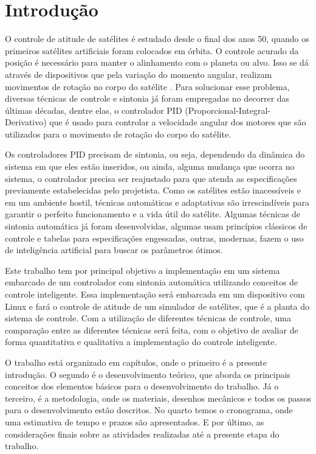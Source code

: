 \chapter[Introdução]{Introdução}

O controle de atitude de satélites é estudado desde o final dos anos 50, quando os primeiros satélites artificiais foram colocados em órbita. O controle acurado da posição é necessário para manter o alinhamento com o planeta ou alvo. Isso se dá através de dispositivos que pela variação do momento angular, realizam movimentos de rotação no corpo do satélite . Para solucionar esse problema, diversas técnicas de controle e sintonia já foram empregadas no decorrer das últimas décadas, dentre elas, o controlador PID (Proporcional-Integral-Derivativo) que é usado para controlar a velocidade angular dos motores que são utilizados para o movimento de rotação do corpo do satélite.

Os controladores PID precisam de sintonia, ou seja, dependendo da dinâmica do sistema em que eles estão inseridos, ou ainda, alguma mudança que ocorra no sistema, o controlador precisa ser reajustado para que atenda as especificações previamente estabelecidas pelo projetista. Como os satélites estão inacessíveis e em um ambiente hostil, técnicas automáticas e adaptativas são irrescindíveis para garantir o perfeito funcionamento e a vida útil do satélite. Algumas técnicas de sintonia automática já foram desenvolvidas, algumas usam princípios clássicos de controle e tabelas para especificações engessadas, outras, modernas, fazem o uso de inteligência artificial para buscar os parâmetros ótimos.


Este trabalho tem por principal objetivo a implementação em um sistema embarcado de um controlador com sintonia automática utilizando conceitos de controle inteligente. Essa implementação será embarcada em um dispositivo com Linux  e fará o controle de atitude de um simulador de satélites, que é a planta do sistema de controle. Com a utilização de diferentes técnicas de controle, uma comparação entre as diferentes técnicas será feita, com o objetivo de avaliar de forma quantitativa e qualitativa a implementação do controle inteligente.

O trabalho está organizado em capítulos, onde o primeiro é a presente introdução. O segundo é o desenvolvimento teórico, que aborda os principais conceitos dos elementos básicos para o desenvolvimento do trabalho. Já o terceiro, é a metodologia, onde os materiais, desenhos mecânicos e todos os passos para o desenvolvimento estão descritos. No quarto temos o cronograma, onde uma estimativa de tempo e prazos são apresentados. E por último, as considerações finais sobre as atividades realizadas até a presente etapa do trabalho.











